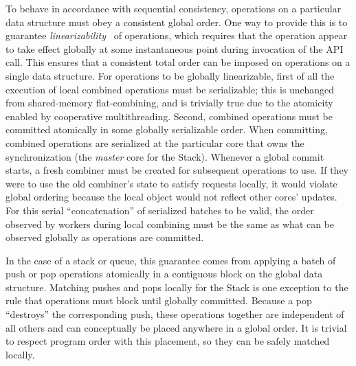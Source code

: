 To behave in accordance with sequential consistency, operations on a particular data structure must obey a consistent global order.
One way to provide this is to guarantee \emph{linearizability}~\cite{herlihy1990linearizability} of operations, which requires that the operation appear to take effect globally at some instantaneous point during invocation of the API call. This ensures that a consistent total order can be imposed on operations on a single data structure.
For operations to be globally linearizable, first of all the execution of local combined operations must be serializable;
this is unchanged from shared-memory flat-combining, and is trivially true due to the atomicity enabled by cooperative multithreading.
Second, combined operations must be committed atomically in some globally serializable order.
When committing, combined operations are serialized at the particular core that owns the synchronization (the \emph{master} core for the Stack).
Whenever a global commit starts, a fresh combiner must be created for subsequent operations to use. If they were to use the old combiner's state to satisfy requests locally, it would violate global ordering because the local object would not reflect other cores' updates.
For this serial ``concatenation'' of serialized batches to be valid, the order observed by workers during local combining must be the same as what can be observed globally as operations are committed.

In the case of a stack or queue, this guarantee comes from applying a batch of push or pop operations atomically in a contiguous block on the global data structure.
Matching pushes and pops locally for the Stack is one exception to the rule that operations must block until globally committed. Because a pop ``destroys'' the corresponding push, these operations together are independent of all others and can conceptually be placed anywhere in a global order. It is trivial to respect program order with this placement, so they can be safely matched locally.


